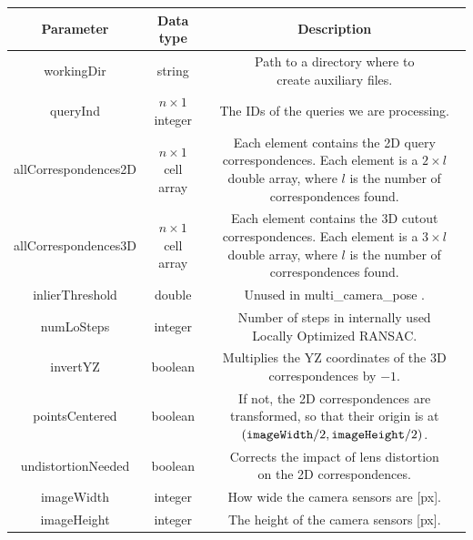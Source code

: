 \documentclass[twoside]{ctuthesis}
\theoremstyle{plain}
\theoremstyle{definition}
\theoremstyle{note}
\newcommand{\code}[1]{{\ttfamily #1%
}}
\begin{document}
\begin{table}[htb!]
	\centering
	\footnotesize
	\begin{tabular}{|c|c|c|}
		\hline
		Parameter & Data type & Description \\
		\hline
		\hline
		\code{workingDir} & string & \makecell{Path to a directory where to \\ create auxiliary files.} \\
		\hline
		\code{queryInd} & $n \times 1$ integer & The IDs of the queries we are processing. \\
		\hline
		\code{allCorrespondences2D} & $n \times 1$ cell array & \makecell{Each element contains the \\ 2D query correspondences. \\ Each element is a $2 \times l$ double array, \\ where $l$ is the number of correspondences found.} \\
		\hline
		\code{allCorrespondences3D} & $n \times 1$ cell array & \makecell{Each element contains the \\ 3D cutout correspondences. \\ Each element is a $3 \times l$ double array, \\ where $l$ is the number of correspondences found.} \\
		\hline
		\code{inlierThreshold} & double & Unused in \code{multi\_camera\_pose}. \\
		\hline
		\code{numLoSteps} & integer & \makecell{Number of steps in internally used \\ Locally Optimized RANSAC.} \\
		\hline
		\code{invertYZ} & boolean & \makecell{Multiplies the YZ coordinates of the \\ 3D correspondences by $-1$.} \\
		\hline
		\code{pointsCentered} & boolean & \makecell{If not, the 2D correspondences are transformed, \\ so that their origin is \\ at $(\text{\code{imageWidth}}/2, \text{\code{imageHeight}}/2)$.} \\
		\hline
		\code{undistortionNeeded} & boolean & \makecell{Corrects the impact of lens distortion\footnotemark \\ on the 2D correspondences.} \\
		\hline
		\code{imageWidth} & integer & How wide the camera sensors are [px]. \\
		\hline
		\code{imageHeight} & integer & The height of the camera sensors [px]. \\

\end{tabular}
\end{table}
\end{document}
